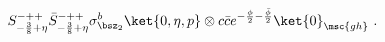 \begin{equation}
S^{-++}_{-\frac{3}{8}+\eta}\bar{S}^{-++}_{-\frac{3}{8}+\eta}
\sigma_{\bsz_2}^b\ket{0,\eta,p}\otimes 
c\bar{c}e^{-\frac{\phi}{2}-\frac{\bar{\phi}}{2}}\ket{0}_{\msc{gh}}~. 
\label{twisted BPS}
\end{equation}

